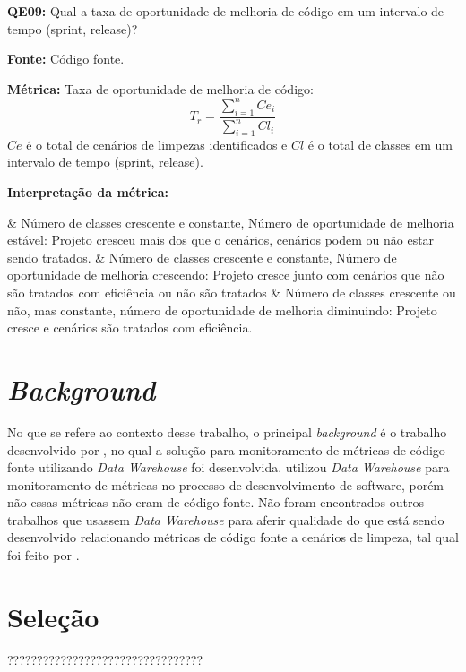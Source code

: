 
\textbf{QE09: } Qual a taxa de oportunidade de melhoria de código em um intervalo de tempo (sprint, release)? 

\textbf{Fonte:} Código fonte.

\textbf{Métrica:} Taxa de oportunidade de melhoria de código: $$ T_r =   \frac{{\sum_{i=1}^{n}{Ce_i}}}{\sum_{i=1}^{n}{Cl_i}} $$ $ Ce $ é o total de cenários de limpezas identificados e $ Cl $  é o total de classes em um intervalo de tempo (sprint, release).

\textbf{Interpretação da métrica: } 

\begin{easylist}[itemize]	
	& Número de classes crescente e constante, Número de oportunidade de melhoria estável: Projeto cresceu mais dos 	que o cenários, cenários podem ou não estar sendo tratados.
	& Número de classes crescente e constante, Número de oportunidade de melhoria crescendo: Projeto cresce junto 		com cenários que não são tratados com eficiência ou não são tratados
	& Número de classes crescente ou não, mas constante, número de oportunidade de melhoria diminuindo: Projeto 		cresce e cenários são tratados com eficiência.	
	\end{easylist}	

\section{\textit{Background}}

No que se refere ao contexto desse trabalho, o principal \textit{background} é o trabalho desenvolvido por , no qual a solução para monitoramento de métricas de código fonte utilizando \textit{Data Warehouse} foi desenvolvida.  utilizou \textit{Data Warehouse} para monitoramento de métricas no processo de desenvolvimento de software, porém não essas métricas não eram de código fonte. Não foram encontrados outros trabalhos que usassem \textit{Data Warehouse} para aferir qualidade do que está sendo desenvolvido relacionando métricas de código fonte a cenários de limpeza, tal qual foi feito por .

\section{Seleção}

?????????????????????????????????

